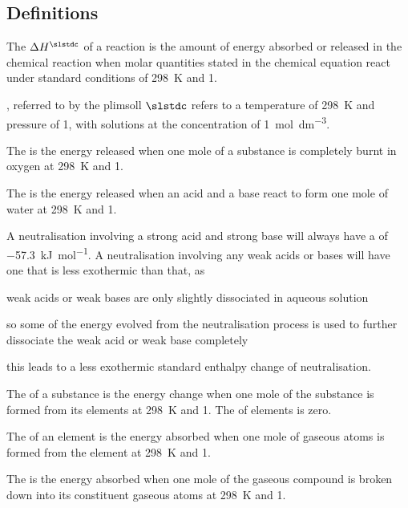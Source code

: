 \documentclass[Chemistry.tex]{subfiles}
\begin{document}
\subsection{Definitions}
The  \(\Delta H^\slstdc\) of a reaction is the amount of energy absorbed or released in the chemical reaction when molar quantities stated in the chemical equation react under standard conditions of \SI{298}{\kelvin} and \SI{1}{\atmosphere}.

, referred to by the plimsoll \(\slstdc\) refers to a temperature of \SI{298}{\kelvin} and pressure of \SI{1}{\atmosphere}, with solutions at the concentration of \SI{1}{\mol\per\cubic\deci\metre}.

The   is the energy released when one mole of a substance is completely burnt in oxygen at \SI{298}{\kelvin} and \SI{1}{\atmosphere}.

The   is the energy released when an acid and a base react to form one mole of water at \SI{298}{\kelvin} and \SI{1}{\atmosphere}.

A neutralisation involving a strong acid and strong base will always have a  of \SI{-57.3}{\kilo\joule\per\mol}. A neutralisation involving any weak acids or bases will have one that is less exothermic than that, as \begin{slinenum}
\item weak acids or weak bases are only slightly dissociated in aqueous solution
\item so some of the energy evolved from the neutralisation process is used to further dissociate the weak acid or weak base completely
\item this leads to a less exothermic standard enthalpy change of neutralisation.
\end{slinenum}

The   of a substance is the energy change when one mole of the substance is formed from its elements at \SI{298}{\kelvin} and \SI{1}{\atmosphere}. The  of elements is zero.

The   of an element is the energy absorbed when one mole of gaseous atoms is formed from the element at \SI{298}{\kelvin} and \SI{1}{\atmosphere}.

The  is the energy absorbed when one mole of the gaseous compound is broken down into its constituent gaseous atoms at \SI{298}{\kelvin} and \SI{1}{\atmosphere}.
\end{document}
